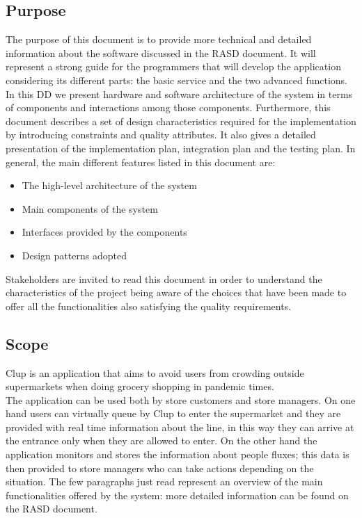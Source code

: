 \subsection{Purpose}
The purpose of this document is to provide more technical and detailed information about the software
discussed in the RASD document. It will represent a strong guide for the programmers that will develop the
application considering its different parts: the basic service and the two advanced functions.
In this DD we present hardware and software architecture of the system in terms of components and interactions among those components. Furthermore, this document describes a set of design characteristics required for the implementation by introducing constraints and quality attributes.
It also gives a detailed presentation of the implementation plan, integration plan and the testing plan.
In general, the main different features listed in this document are:
\begin{itemize}
	\item The high-level architecture of the system
	\item Main components of the system
	\item Interfaces provided by the components
	\item Design patterns adopted
\end{itemize}
Stakeholders are invited to read this document in order to understand the characteristics of the project
being aware of the choices that have been made to offer all the functionalities also satisfying the quality requirements.

\subsection{Scope}
Clup is an application that aims to avoid users from crowding outside supermarkets when doing grocery shopping in pandemic times.\\
The application can be used both by store customers and store managers. On one hand users can virtually queue by Clup to enter the supermarket and they are provided with real time information about the line, in this way they can arrive at the entrance only when they are allowed to enter. On the other hand the application monitors and stores the information about people fluxes; this data is then provided to store managers who can take actions depending on the situation. 
The few paragraphs just read represent an overview of the main functionalities offered by the system:
more detailed information can be found on the RASD document.
